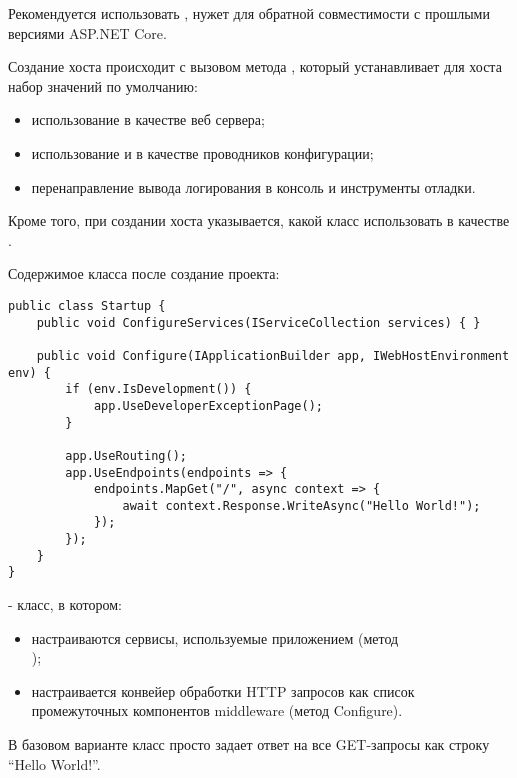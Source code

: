 \documentclass[a4paper,14pt]{extarticle}
\begin{document}
Рекомендуется использовать ,  нужет для обратной совместимости с прошлыми версиями ASP.NET Core.

Создание хоста происходит с вызовом метода , который
устанавливает для хоста набор значений по умолчанию:

\begin{itemize}
    \item использование  в качестве веб сервера;
    \item использование  и
          в качестве проводников конфигурации;
    \item перенаправление вывода логирования в консоль и инструменты отладки.
\end{itemize}

Кроме того, при создании хоста указывается, какой класс использовать в качестве
.

Содержимое класса  после создание проекта:

\begin{lstlisting}
public class Startup {
    public void ConfigureServices(IServiceCollection services) { }

    public void Configure(IApplicationBuilder app, IWebHostEnvironment env) {
        if (env.IsDevelopment()) {
            app.UseDeveloperExceptionPage();
        }

        app.UseRouting();
        app.UseEndpoints(endpoints => {
            endpoints.MapGet("/", async context => {
                await context.Response.WriteAsync("Hello World!");
            });
        });
    }
}
\end{lstlisting}

 - класс, в котором:

\begin{itemize}
    \item настраиваются сервисы, используемые приложением (метод\\
          );
    \item настраивается конвейер обработки HTTP запросов как список
          промежуточных компонентов middleware (метод Configure).
\end{itemize}

В базовом варианте класс просто задает ответ на все GET-запросы как строку
\enquote{Hello World!}.
\end{document}
